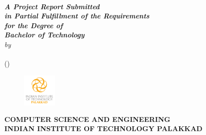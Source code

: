 \begin{titlepage}
\begin{center}
\textheight 15.5in \textwidth 12.5in {\large\sf  \textbf{\the\btptitle}}\\[12ex]
{\small{\textsl{ \textbf{A Project Report Submitted \\
in Partial Fulfillment of the Requirements \\
for the Degree of \\
[3ex]\small \bf Bachelor of Technology}}}}\\
[6ex] \emph{by}
\\[6ex]
{\sf \sf \textbf{\the\name}\\
             (\the\rollno)} \\[7ex]

\vspace{1.2in}

 \begin{figure}[!h]
\centering
 \includegraphics[width=0.15\textwidth]{IITPkdFullLogoColor}
 \end{figure}



{\small\bf COMPUTER SCIENCE AND ENGINEERING}  \\[1ex]
{\small \bf{INDIAN INSTITUTE OF TECHNOLOGY PALAKKAD}}
%
\end{center}
\end{titlepage}


